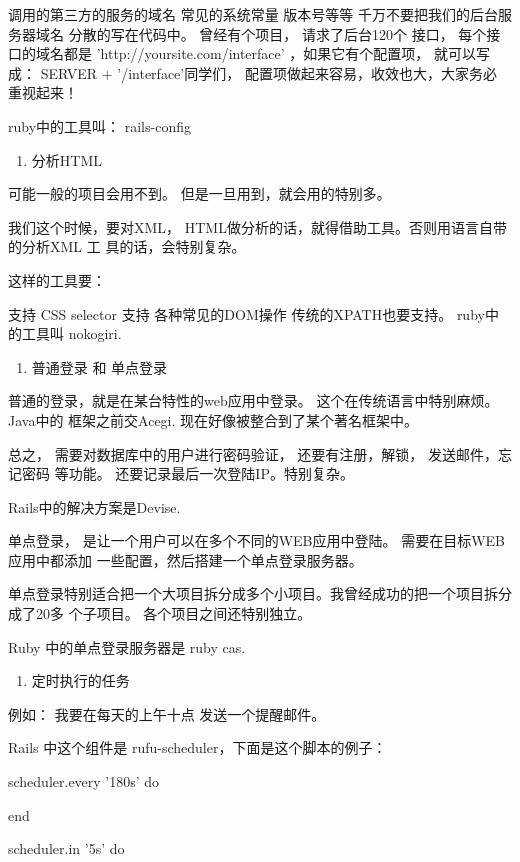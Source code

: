 \documentclass[11pt]{ctexart}
\begin{document}
{{{{调用的第三方的服务的域名
常见的系统常量
版本号等等
千万不要把我们的后台服务器域名 分散的写在代码中。 曾经有个项目， 请求了后台120个
接口， 每个接口的域名都是 'http://yoursite.com/interface' ，如果它有个配置项，
就可以写成： SERVER + '/interface'同学们， 配置项做起来容易，收效也大，大家务必
重视起来！


ruby中的工具叫： rails-config

\begin{enumerate}
\item 分析HTML
\end{enumerate}

可能一般的项目会用不到。 但是一旦用到，就会用的特别多。

我们这个时候，要对XML， HTML做分析的话，就得借助工具。否则用语言自带的分析XML 工
具的话，会特别复杂。


这样的工具要：

支持 CSS selector
支持 各种常见的DOM操作
传统的XPATH也要支持。
ruby中的工具叫 nokogiri.

\begin{enumerate}
\item 普通登录 和 单点登录
\end{enumerate}

普通的登录，就是在某台特性的web应用中登录。 这个在传统语言中特别麻烦。 Java中的
框架之前交Acegi. 现在好像被整合到了某个著名框架中。


总之， 需要对数据库中的用户进行密码验证， 还要有注册，解锁， 发送邮件，忘记密码
等功能。 还要记录最后一次登陆IP。特别复杂。


Rails中的解决方案是Devise.

单点登录， 是让一个用户可以在多个不同的WEB应用中登陆。 需要在目标WEB应用中都添加
一些配置，然后搭建一个单点登录服务器。


单点登录特别适合把一个大项目拆分成多个小项目。我曾经成功的把一个项目拆分成了20多
个子项目。 各个项目之间还特别独立。


Ruby 中的单点登录服务器是 ruby cas.

\begin{enumerate}
\item 定时执行的任务
\end{enumerate}

例如： 我要在每天的上午十点 发送一个提醒邮件。

Rails 中这个组件是 rufu-scheduler，下面是这个脚本的例子：


scheduler.every '180s' do

end

scheduler.in '5s' do

}}}}
\end{document}
